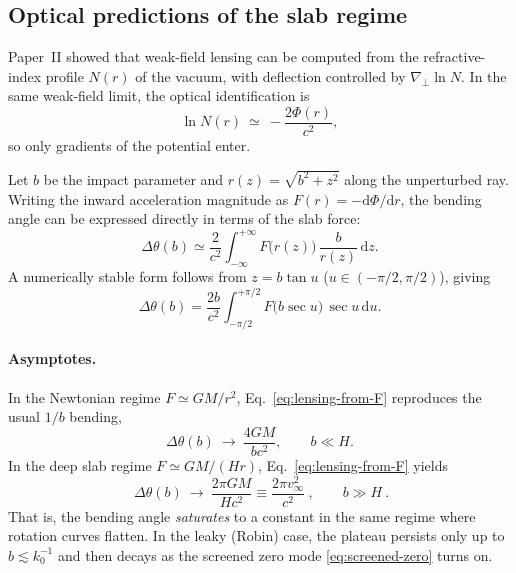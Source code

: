 \documentclass[12pt]{article}
\begin{document}
\subsection{Optical predictions of the slab regime}
\label{subsec:lensing-slab}

Paper~II showed that weak-field lensing can be computed from the refractive-index profile $N(r)$ of the vacuum, with deflection controlled by $\nabla_\perp\ln N$. In the same weak-field limit, the optical identification is
\begin{equation}
  \ln N(r)\ \simeq\ -\frac{2\Phi(r)}{c^2},
\end{equation}
so only gradients of the potential enter.

Let $b$ be the impact parameter and $r(z)=\sqrt{b^2+z^2}$ along the unperturbed ray. Writing the inward acceleration magnitude as $F(r)= -\mathrm{d}\Phi/\mathrm{d}r$, the bending angle can be expressed directly in terms of the slab force:
\begin{equation}
  \Delta\theta(b)
  \simeq \frac{2}{c^2}\int_{-\infty}^{+\infty} F\!\bigl(r(z)\bigr)\,\frac{b}{r(z)}\,\mathrm{d}z.
  \label{eq:lensing-from-F}
\end{equation}
A numerically stable form follows from $z=b\tan u$ ($u\in(-\pi/2,\pi/2)$), giving
\begin{equation}
  \Delta\theta(b)
  = \frac{2b}{c^2}\int_{-\pi/2}^{+\pi/2} F\!\bigl(b\sec u\bigr)\,\sec u\,\mathrm{d}u.
  \label{eq:lensing-stable}
\end{equation}

\paragraph{Asymptotes.}
In the Newtonian regime $F\simeq GM/r^2$, Eq.~\eqref{eq:lensing-from-F} reproduces the usual $1/b$ bending,
\begin{equation}
  \Delta\theta(b)\ \to\ \frac{4GM}{b c^2}, \qquad b\ll H.
\end{equation}
In the deep slab regime $F\simeq GM/(Hr)$, Eq.~\eqref{eq:lensing-from-F} yields
\begin{equation}
  \boxed{\ \Delta\theta(b)\ \to\ \frac{2\pi GM}{Hc^2}
  \equiv \frac{2\pi v_\infty^2}{c^2}\ ,\qquad b\gg H\ }.
  \label{eq:lensing-plateau}
\end{equation}
That is, the bending angle \emph{saturates} to a constant in the same regime where rotation curves flatten. In the leaky (Robin) case, the plateau persists only up to $b\lesssim k_0^{-1}$ and then decays as the screened zero mode \eqref{eq:screened-zero} turns on.
\end{document}
